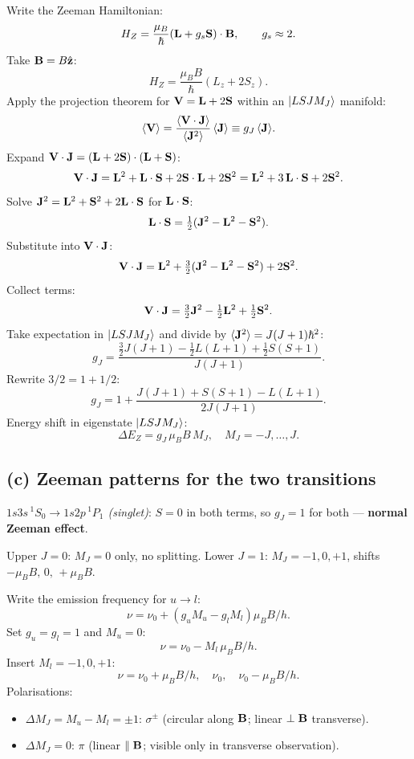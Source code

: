 \documentclass[11pt]{article}
\begin{document}
Write the Zeeman Hamiltonian:
\[
H_Z = \frac{\mu_B}{\hbar}(\vb L + g_s\vb S)\cdot\vb B,\qquad g_s\approx 2.
\]
Take $\vb B = B\hat{\vb z}$:
\[
H_Z = \frac{\mu_B B}{\hbar}(L_z + 2 S_z).
\]
Apply the projection theorem for $\vb V = \vb L + 2\vb S$ within an $\ket{LSJM_J}$ manifold:
\[
\langle\vb V\rangle = \frac{\langle\vb V\cdot\vb J\rangle}{\langle\vb J^2\rangle}\,\langle\vb J\rangle \equiv g_J\,\langle\vb J\rangle.
\]
Expand $\vb V\cdot\vb J = (\vb L+2\vb S)\cdot(\vb L+\vb S)$:
\[
\vb V\cdot\vb J = \vb L^2 + \vb L\cdot\vb S + 2\vb S\cdot\vb L + 2\vb S^2 = \vb L^2 + 3\,\vb L\cdot\vb S + 2\vb S^2.
\]
Solve $\vb J^2=\vb L^2+\vb S^2+2\vb L\cdot\vb S$ for $\vb L\cdot\vb S$:
\[
\vb L\cdot\vb S = \tfrac{1}{2}(\vb J^2 - \vb L^2 - \vb S^2).
\]
Substitute into $\vb V\cdot\vb J$:
\[
\vb V\cdot\vb J = \vb L^2 + \tfrac{3}{2}(\vb J^2 - \vb L^2 - \vb S^2) + 2\vb S^2.
\]
Collect terms:
\[
\vb V\cdot\vb J = \tfrac{3}{2}\vb J^2 - \tfrac{1}{2}\vb L^2 + \tfrac{1}{2}\vb S^2.
\]
Take expectation in $\ket{LSJM_J}$ and divide by $\langle\vb J^2\rangle=J(J+1)\hbar^2$:
\[
g_J = \frac{\tfrac{3}{2}J(J+1) - \tfrac{1}{2}L(L+1) + \tfrac{1}{2}S(S+1)}{J(J+1)}.
\]
Rewrite $3/2 = 1 + 1/2$:
\[
g_J = 1 + \frac{J(J+1)+S(S+1)-L(L+1)}{2J(J+1)}.
\]
Energy shift in eigenstate $\ket{LSJM_J}$:
\[
\boxed{\;\Delta E_Z = g_J\,\mu_B B\,M_J,\quad M_J=-J,\dots,J.\;}
\]

\subsection*{(c) Zeeman patterns for the two transitions}

\textit{$1s3s\,{}^1S_0\!\to\!1s2p\,{}^1P_1$ (singlet)}: $S=0$ in both terms, so $g_J=1$ for both --- \textbf{normal Zeeman effect}.

Upper $J=0$: $M_J=0$ only, no splitting.
Lower $J=1$: $M_J=-1,0,+1$, shifts $-\mu_B B,\,0,\,+\mu_B B$.

Write the emission frequency for $u\to l$:
\[
\nu = \nu_0 + (g_u M_u - g_l M_l)\mu_B B/h.
\]
Set $g_u=g_l=1$ and $M_u=0$:
\[
\nu = \nu_0 - M_l\,\mu_B B/h.
\]
Insert $M_l=-1,0,+1$:
\[
\nu = \nu_0+\mu_B B/h,\quad \nu_0,\quad \nu_0-\mu_B B/h.
\]
Polarisations:
\begin{itemize}
\item $\Delta M_J = M_u-M_l = \pm 1$: $\sigma^\pm$ (circular along $\vb B$; linear $\perp\vb B$ transverse).
\item $\Delta M_J = 0$: $\pi$ (linear $\parallel\vb B$; visible only in transverse observation).
\end{itemize}
\end{document}
